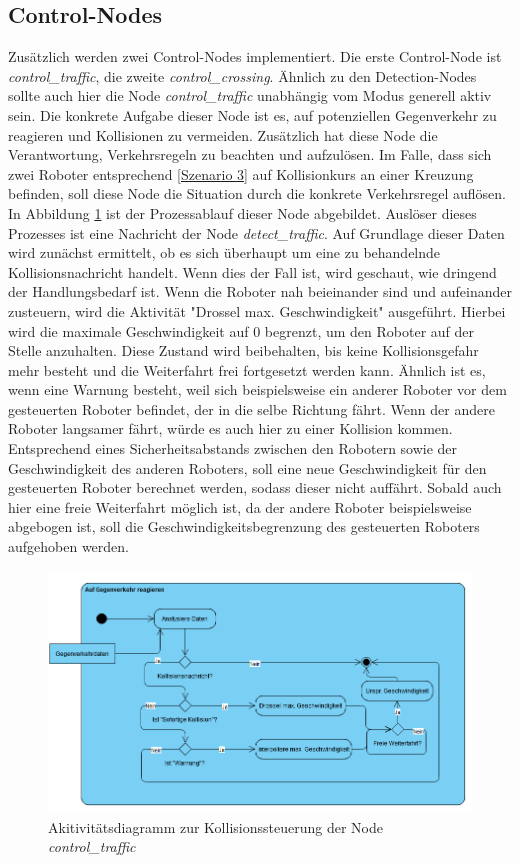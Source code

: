 \subsection{Control-Nodes}
Zusätzlich werden zwei Control-Nodes implementiert. Die erste Control-Node ist \textit{control\_traffic}, die zweite \textit{control\_crossing}. Ähnlich zu den Detection-Nodes
sollte auch hier die Node \textit{control\_traffic} unabhängig vom Modus generell aktiv sein. Die konkrete Aufgabe dieser Node ist es, auf potenziellen Gegenverkehr zu reagieren
und Kollisionen zu vermeiden. Zusätzlich hat diese Node die Verantwortung, Verkehrsregeln zu beachten und aufzulösen. Im Falle, dass sich zwei Roboter entsprechend \ref{Szenario 3} 
auf Kollisionkurs an einer Kreuzung befinden, soll diese Node die Situation durch die konkrete Verkehrsregel auflösen. In Abbildung \ref{fig:ControlTraffic_Activity} ist der Prozessablauf dieser Node abgebildet.
Auslöser dieses Prozesses ist eine Nachricht der Node \textit{detect\_traffic}. Auf Grundlage dieser Daten wird zunächst ermittelt, ob es sich überhaupt um eine zu behandelnde
Kollisionsnachricht handelt. Wenn dies der Fall ist, wird geschaut, wie dringend der Handlungsbedarf ist. Wenn die Roboter nah beieinander sind und aufeinander zusteuern, wird
die Aktivität "Drossel max. Geschwindigkeit" ausgeführt. Hierbei wird die maximale Geschwindigkeit auf 0 begrenzt, um den Roboter auf der Stelle anzuhalten. Diese Zustand wird beibehalten,
bis keine Kollisionsgefahr mehr besteht und die Weiterfahrt frei fortgesetzt werden kann. Ähnlich ist es, wenn eine Warnung besteht, weil sich beispielsweise ein anderer Roboter vor
dem gesteuerten Roboter befindet, der in die selbe Richtung fährt. Wenn der andere Roboter langsamer fährt, würde es auch hier zu einer Kollision kommen. Entsprechend eines Sicherheitsabstands
zwischen den Robotern sowie der Geschwindigkeit des anderen Roboters, soll eine neue Geschwindigkeit für den gesteuerten Roboter berechnet werden, sodass dieser nicht auffährt.
Sobald auch hier eine freie Weiterfahrt möglich ist, da der andere Roboter beispielsweise abgebogen ist, soll die Geschwindigkeitsbegrenzung des gesteuerten Roboters aufgehoben werden.

\begin{figure}[h!]
  \centering
  \includegraphics[width=\linewidth]{images/ControlTraffic_activity.PNG}
  \caption{Akitivitätsdiagramm zur Kollisionssteuerung der Node \textit{control\_traffic}}
  \label{fig:ControlTraffic_Activity}
\end{figure}

